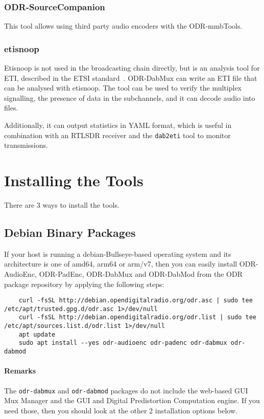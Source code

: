 \subsubsection{ODR-SourceCompanion}
This tool allows using third party audio encoders with the ODR-mmbTools.

\subsubsection{etisnoop}
Etisnoop is not used in the broadcasting chain directly, but is an analysis tool
for ETI, described in the ETSI standard~\cite{etsidabeti}. ODR-DabMux can write
an ETI file that can be analysed with etisnoop. The tool can be used to verify
the multiplex signalling, the presence of data in the subchannels, and it can
decode audio into files.

Additionally, it can output statistics in YAML format, which is useful in
combination with an RTLSDR receiver and the \verb+dab2eti+ tool to monitor
transmissions.

\clearpage
\section{Installing the Tools}
There are 3 ways to install the tools.

\subsection{Debian Binary Packages}
If your host is running a debian-Bullseye-based operating system and its
architecture is one of amd64, arm64 or arm/v7, then you can easily install
ODR-AudioEnc, ODR-PadEnc, ODR-DabMux and ODR-DabMod
from the ODR package repository by applying the following steps:

\begin{lstlisting}
    curl -fsSL http://debian.opendigitalradio.org/odr.asc | sudo tee /etc/apt/trusted.gpg.d/odr.asc 1>/dev/null
    curl -fsSL http://debian.opendigitalradio.org/odr.list | sudo tee /etc/apt/sources.list.d/odr.list 1>/dev/null
    apt update
    sudo apt install --yes odr-audioenc odr-padenc odr-dabmux odr-dabmod
\end{lstlisting}

\paragraph{Remarks}
The \texttt{odr-dabmux} and \texttt{odr-dabmod} packages do not include the web-based GUI Mux Manager
and the GUI and Digital Predistortion Computation engine. If you need those, then you
should look at the other 2 installation options below.


